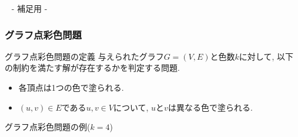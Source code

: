 \appendix
\backupbegin

\begin{frame}{~}
 \centering
 - 補足用 -
\end{frame} 

\begin{frame}\frametitle{グラフ点彩色問題}
    
  \begin{block}{グラフ点彩色問題の定義}
    与えられたグラフ$G=(V, E)$と色数$k$に対して, 以下の制約を満たす解が存在するかを判定する問題.
    \begin{itemize}
      \item 各頂点は1つの色で塗られる.
      \item $(u, v) \in E$である$u, v \in V$について, $u$と$v$は異なる色で塗られる.
    \end{itemize}
  \end{block}
  
  \begin{exampleblock}{グラフ点彩色問題の例($k=4$)}
    \begin{columns}
      \begin{column}{1.0\textwidth}
        \centering
        
      \end{column}
    \end{columns}
  \end{exampleblock}
  

\end{frame}


